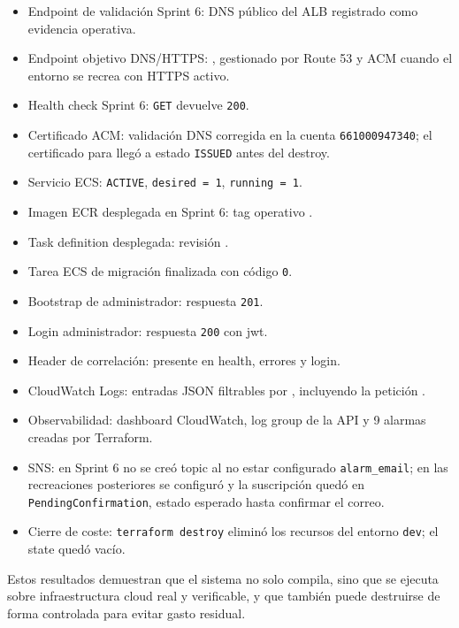 \begin{itemize}
  \item Endpoint de validación Sprint 6: DNS público del ALB registrado como evidencia operativa.
  \item Endpoint objetivo DNS/HTTPS: , gestionado por Route 53 y ACM cuando el entorno se recrea con HTTPS activo.
  \item Health check Sprint 6: \texttt{GET}  devuelve \texttt{200}.
  \item Certificado ACM: validación DNS corregida en la cuenta \texttt{661000947340}; el certificado para  llegó a estado \texttt{ISSUED} antes del destroy.
  \item Servicio ECS: \texttt{ACTIVE}, \texttt{desired = 1}, \texttt{running = 1}.
  \item Imagen ECR desplegada en Sprint 6: tag operativo .
  \item Task definition desplegada: revisión .
  \item Tarea ECS de migración finalizada con código \texttt{0}.
  \item Bootstrap de administrador: respuesta \texttt{201}.
  \item Login administrador: respuesta \texttt{200} con \acrshort{jwt}.
  \item Header de correlación:  presente en health, errores y login.
  \item CloudWatch Logs: entradas JSON filtrables por , incluyendo la petición .
  \item Observabilidad: dashboard CloudWatch, log group de la API y 9 alarmas creadas por Terraform.
  \item SNS: en Sprint 6 no se creó topic al no estar configurado \texttt{alarm\_email}; en las recreaciones posteriores se configuró  y la suscripción quedó en \texttt{PendingConfirmation}, estado esperado hasta confirmar el correo.
  \item Cierre de coste: \texttt{terraform destroy} eliminó los recursos del entorno \texttt{dev}; el state quedó vacío.
\end{itemize}

Estos resultados demuestran que el sistema no solo compila, sino que se ejecuta sobre infraestructura cloud real y verificable, y que también puede destruirse de forma controlada para evitar gasto residual.

